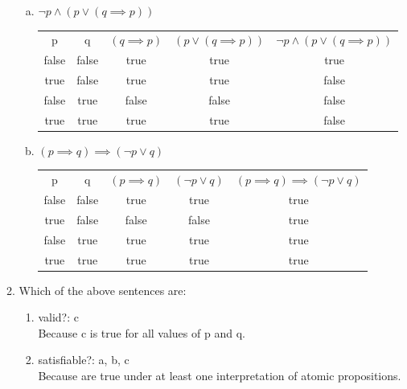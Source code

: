 \documentclass{article}
\begin{document}
\begin{enumerate}[\bf I.]
\begin{enumerate}[1.]
\begin{enumerate}[a.]
                \item $\neg p \land (p \lor (q\implies p))$
                \begin{center}
                    \begin{tabular}{ |c|c|c|c|c| }
                        \hline
                        p & q & $(q\implies p)$ & $(p \lor (q\implies p))$ & $\neg p \land (p \lor (q\implies p))$ \\
                        false & false & true & true & true \\
                        true & false & true & true & false \\
                        false & true & false & false & false \\
                        true & true & true & true & false \\
                        \hline
                    \end{tabular}
                \end{center}
                \item $(p \implies q)\implies(\neg p \lor q)$
                \begin{center}
                    \begin{tabular}{ |c|c|c|c|c| }
                        \hline
                        p & q & $(p \implies q)$ & $(\neg p \lor q)$ & $(p \implies q)\implies(\neg p \lor q)$ \\
                        false & false & true & true & true \\
                        true & false & false & false & true \\
                        false & true & true & true & true \\
                        true & true & true & true & true \\
                        \hline
                    \end{tabular}
                \end{center}
            \end{enumerate}
            \item Which of the above sentences are:
            \begin{enumerate}
                \item valid?: c \\
                Because c is true for all values of p and q.
                \item satisfiable?: a, b, c \\
                Because are true under at least one interpretation of atomic propositions.

\end{enumerate}
\end{enumerate}
\end{enumerate}
\end{document}
